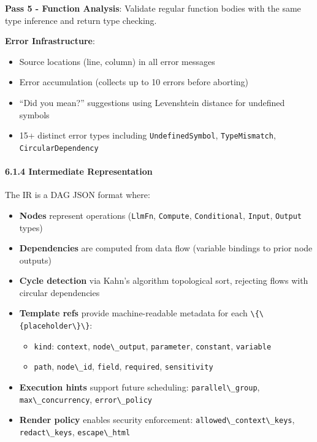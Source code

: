\documentclass[
]{article}
\newcommand{\passthrough}[1]{#1}
\providecommand{\tightlist}{%
  \setlength{\itemsep}{0pt}\setlength{\parskip}{0pt}}
\begin{document}
\textbf{Pass 5 - Function Analysis}: Validate regular function bodies
with the same type inference and return type checking.

\textbf{Error Infrastructure}:

\begin{itemize}
\tightlist
\item
  Source locations (line, column) in all error messages
\item
  Error accumulation (collects up to 10 errors before aborting)
\item
  ``Did you mean?'' suggestions using Levenshtein distance for undefined
  symbols
\item
  15+ distinct error types including
  \passthrough{\lstinline!UndefinedSymbol!},
  \passthrough{\lstinline!TypeMismatch!},
  \passthrough{\lstinline!CircularDependency!}
\end{itemize}

\paragraph{6.1.4 Intermediate
Representation}\label{intermediate-representation}

The IR is a DAG JSON format where:

\begin{itemize}
\tightlist
\item
  \textbf{Nodes} represent operations (\passthrough{\lstinline!LlmFn!},
  \passthrough{\lstinline!Compute!},
  \passthrough{\lstinline!Conditional!},
  \passthrough{\lstinline!Input!}, \passthrough{\lstinline!Output!}
  types)
\item
  \textbf{Dependencies} are computed from data flow (variable bindings
  to prior node outputs)
\item
  \textbf{Cycle detection} via Kahn's algorithm topological sort,
  rejecting flows with circular dependencies
\item
  \textbf{Template refs} provide machine-readable metadata for each
  \passthrough{\lstinline!\{\{placeholder\}\}!}:

  \begin{itemize}
  \tightlist
  \item
    \passthrough{\lstinline!kind!}: \passthrough{\lstinline!context!},
    \passthrough{\lstinline!node\_output!},
    \passthrough{\lstinline!parameter!},
    \passthrough{\lstinline!constant!},
    \passthrough{\lstinline!variable!}
  \item
    \passthrough{\lstinline!path!}, \passthrough{\lstinline!node\_id!},
    \passthrough{\lstinline!field!}, \passthrough{\lstinline!required!},
    \passthrough{\lstinline!sensitivity!}
  \end{itemize}
\item
  \textbf{Execution hints} support future scheduling:
  \passthrough{\lstinline!parallel\_group!},
  \passthrough{\lstinline!max\_concurrency!},
  \passthrough{\lstinline!error\_policy!}
\item
  \textbf{Render policy} enables security enforcement:
  \passthrough{\lstinline!allowed\_context\_keys!},
  \passthrough{\lstinline!redact\_keys!},
  \passthrough{\lstinline!escape\_html!}
\end{itemize}
\end{document}
